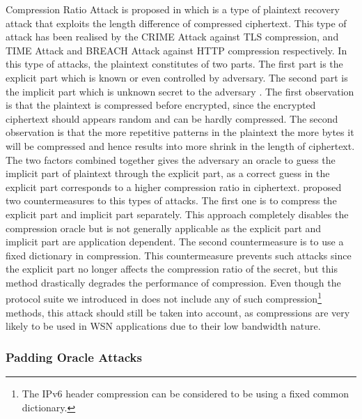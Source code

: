 Compression Ratio Attack is proposed in \cite{CompressionRationAttack} which is a type of plaintext recovery attack that exploits the length difference of compressed ciphertext. This type of attack has been realised by the CRIME\cite{CRIME} Attack against TLS compression, and TIME\cite{TIME} Attack and BREACH\cite{BREACH} Attack against HTTP compression respectively. In this type of attacks, the plaintext constitutes of two parts. The first part is the explicit part which is known or even controlled by adversary. The second part is the implicit part which is unknown secret to the adversary . The first observation is that the plaintext is compressed before encrypted, since the encrypted ciphertext should appears random and can be hardly compressed. The second observation is that the more repetitive patterns in the plaintext the more bytes it will be compressed and hence results into more shrink in the length of ciphertext. The two factors combined together gives the adversary an oracle to guess the implicit part of plaintext through the explicit part, as a correct guess in the explicit part corresponds to a higher compression ratio in ciphertext.\cite{CompressionCountermeasure} proposed two countermeasures to this types of attacks. The first one is to compress the explicit part and implicit part separately. This approach completely disables the compression oracle but is not generally applicable as the explicit part and implicit part are application dependent. The second countermeasure is to use a fixed dictionary in compression. This countermeasure prevents such attacks since the explicit part no longer affects the compression ratio of the secret, but this method drastically degrades the performance of compression. Even though the protocol suite we introduced in  does not include any of such compression\footnote{The IPv6 header compression can be considered to be using a fixed common dictionary.} methods, this attack should still be taken into account, as compressions are very likely to be used in WSN applications due to their low bandwidth nature. 

\subsubsection{Padding Oracle Attacks}

